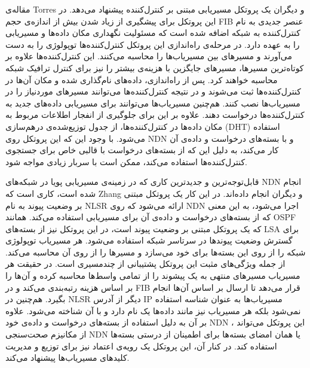 مقاله‌ی Torres و دیگران \cite{controller} یک پروتکل مسیریابی مبتنی بر کنترل‌کننده پیشنهاد می‌دهد. در این پروتکل برای پیشگیری از زیاد شدن بیش از اندازه‌ی حجم FIB عنصر جدیدی به نام کنترل‌کننده به شبکه اضافه شده است که مسئولیت نگهداری مکان داده‌ها و مسیریابی را به عهده دارد. در مرحله‌ی راه‌اندازی این پروتکل کنترل‌کننده‌ها توپولوژی را به دست می‌آورند و مسیرهای بین مسیریاب‌ها را محاسبه می‌کنند. این کنترل‌کننده‌ها علاوه بر کوتاه‌ترین مسیرها، مسیر‌های جایگزین با هزینه‌ی بیشتر را نیز برای کنترل ترافیک شبکه محاسبه خواهند کرد. پس از راه‌اندازی، داده‌های نام‌گذاری شده و مکان آن‌ها در کنترل‌کننده‌ها ثبت می‌شوند و در نتیجه کنترل‌کننده‌ها می‌توانند مسیرهای موردنیاز را در مسیریاب‌ها نصب کنند. هم‌چنین مسیریاب‌ها می‌توانند برای مسیریابی داده‌های جدید به کنترل‌کننده‌ها درخواست دهند. علاوه بر این برای جلوگیری از انفجار اطلاعات مربوط به مکان داده‌ها در کنترل‌کننده‌ها، از جدول توزیع‌شده‌ی درهم‌سازی  (DHT) استفاده می‌شود. با وجود این که این پروتکل روی NDN و با بسته‌های درخواست و داده‌ی آن کار می‌کند، به دلیل این که از بسته‌های درخواست با قالبی خاص برای جستجوی کنترل‌کننده‌ها استفاده می‌کند، ممکن است با سربار زیادی مواجه شود. 

قابل‌توجه‌ترین و جدیدترین کاری که در زمینه‌ی مسیریابی پویا در شبکه‌های NDN انجام شده است، کاری است که Zhang و دیگران \cite{nlsr} انجام داده‌اند. در این کار یک پروتکل مبتنی بر وضعیت پیوند به نام NLSR ارائه می‌شود که روی NDN اجرا می‌شود، به این معنی که از بسته‌های درخواست و داده‌ی آن برای مسیریابی استفاده می‌کند. همانند OSPF که یک پروتکل مبتنی بر وضعیت پیوند است، در این پروتکل نیز از بسته‌های LSA برای گسترش وضعیت پیوندها در سرتاسر شبکه استفاده می‌‌شود. هر مسیریاب توپولوژی شبکه را از روی این بسته‌ها برای خود می‌سازد و مسیرها را از روی آن محاسبه می‌کند. از جمله ویژگی‌های مثبت این پروتکل پشتیبانی از چندمسیری است. در حقیقت هر مسیریاب مسیرهای منتهی به یک پیشوند را از تمامی واسط‌ها محاسبه کرده و آن‌ها را بر اساس هزینه رتبه‌بندی می‌کند و در FIB قرار می‌دهد تا ارسال بر اساس آن‌ها انجام بگیرد. هم‌چنین در NLSR دیگر از آدرس IP مسیریاب‌ها به عنوان شناسه استفاده نمی‌شود بلکه هر مسیریاب نیز مانند داده‌ها یک نام دارد و با آن شناخته می‌شود. علاوه بر آن به دلیل استفاده از بسته‌های درخواست و داده‌ی خود NDN ، این پروتکل می‌تواند از مکانیزم صحت‌سنجی NDN یا همان امضای بسته‌ها برای اطمینان از درستی بسته‌ها استفاده کند. در کنار آن، این پروتکل یک رویه‌ی اعتماد نیز برای توزیع و مدیریت کلید‌های مسیریاب‌ها پیشنهاد می‌کند.

